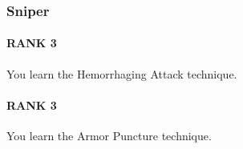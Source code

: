 \subsubsection{Sniper} \label{feat::sniper}
\paragraph{RANK 3} You learn the Hemorrhaging Attack technique.

\paragraph{RANK 3} You learn the Armor Puncture technique.


